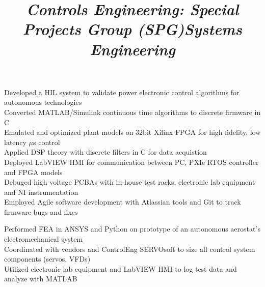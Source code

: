 \documentclass[mm]{res}
\newcommand{\tb}{\textbullet \xspace}
\begin{document}
\begin{resume}
\title{\textsl{Controls Engineering: Special Projects Group (SPG)}}
\begin{position}
\tb Developed a HIL system to validate power electronic control algorithms for autonomous technologies\\
\tb Converted MATLAB/Simulink continuous time algorithms to discrete firmware in C \\
\tb Emulated and optimized plant models on 32bit Xilinx FPGA for high fidelity, low latency $\mu$s control \\
\tb Applied DSP theory with discrete filters in C for data acquistion \\
\tb Deployed LabVIEW HMI for communication between PC, PXIe RTOS controller and FPGA models \\
\tb Debuged high voltage PCBAs with in-house test racks, electronic lab equipment and NI instrumentation \\
\tb Employed Agile software development with Atlassian tools and Git to track firmware bugs and fixes
\end{position}

\title{\textsl{Systems Engineering}}
\begin{position}
\tb Performed FEA in ANSYS and Python on prototype of an autonomous aerostat's electromechanical system \\
\tb Coordinated with vendors and ControlEng SERVOsoft to size all control system components (servos, VFDs) \\
\tb Utilized electronic lab equipment and LabVIEW HMI to log test data and analyze with MATLAB
\end{position}


\end{resume}
\end{document}
